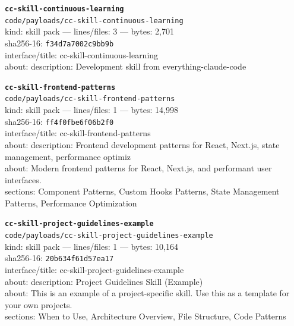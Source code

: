 \noindent\textbf{\texttt{cc-skill-continuous-learning}}\\
\texttt{code/payloads/cc-skill-continuous-learning}\\
kind: skill pack --- lines/files: 3 --- bytes: 2,701\\
sha256-16: \texttt{f34d7a7002c9bb9b}\\
interface/title: cc-skill-continuous-learning\\
about: description: Development skill from everything-claude-code\\
\vspace*{6.0pt}
\newpage

\noindent\textbf{\texttt{cc-skill-frontend-patterns}}\\
\texttt{code/payloads/cc-skill-frontend-patterns}\\
kind: skill pack --- lines/files: 1 --- bytes: 14,998\\
sha256-16: \texttt{ff4f0fbe6f06b2f0}\\
interface/title: cc-skill-frontend-patterns\\
about: description: Frontend development patterns for React, Next.js, state management, performance optimiz\\
about: Modern frontend patterns for React, Next.js, and performant user interfaces.\\
sections: Component Patterns, Custom Hooks Patterns, State Management Patterns, Performance Optimization\\
\vspace*{6.0pt}

\noindent\textbf{\texttt{cc-skill-project-guidelines-example}}\\
\texttt{code/payloads/cc-skill-project-guidelines-example}\\
kind: skill pack --- lines/files: 1 --- bytes: 10,164\\
sha256-16: \texttt{20b634f61d57ea17}\\
interface/title: cc-skill-project-guidelines-example\\
about: description: Project Guidelines Skill (Example)\\
about: This is an example of a project-specific skill. Use this as a template for your own projects.\\
sections: When to Use, Architecture Overview, File Structure, Code Patterns\\
\vspace*{6.0pt}

